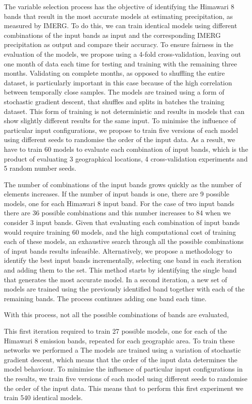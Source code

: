 \documentclass[3p,times]{elsarticle}
\begin{document}
The variable selection process has the objective of identifying the Himawari 8 bands that result in the most accurate models at estimating precipitation, as measured by IMERG. To do this, we can train identical models using different combinations of the input bands as input and the corresponding IMERG precipitation as output and compare their accuracy. To ensure fairness in the evaluation of the models, we propose using a 4-fold cross-validation, leaving out one month of data each time for testing and training with the remaining three months. Validating on complete months, as opposed to shuffling the entire dataset, is particularly important in this case because of the high correlation between temporally close samples. The models are trained using a form of stochastic gradient descent, that shuffles and splits in batches the training dataset. This form of training is not deterministic and results in models that can show slightly different results for the same input. To minimise the influence of particular input configurations, we propose to train five versions of each model using different seeds to randomise the order of the input data. As a result, we have to train 60 models to evaluate each combination of input bands,  which is the product of evaluating 3 geographical locations, 4 cross-validation experiments and 5 random number seeds.

The number of combinations of the input bands grows quickly as the number of elements increases. If the number of input bands is one, there are 9 possible models, one for each Himawari 8 input band. For the case of two input bands there are 36 possible combinations and this number increases to 84 when we consider 3 input bands. Given that evaluating each combination of input bands would require training 60 models, and the high computational cost of training each of these models, an exhaustive search through all the possible combinations of input bands results infeasible. Alternatively, we propose a methodology to identify the best input bands incrementally, selecting one band in each iteration and adding them to the set. This method starts by identifying the single band that generates the most accurate model. In a second iteration, a new set of models are trained using the previously identified band together with each of the remaining bands. The process continues adding one band each time. 

With this process, not all the possible combinations of bands are evaluated, 

This first iteration required to train 27 possible models, one for each of the Himawari 8 emission bands, repeated for each geographic area. To train these networks we performed a  The models are trained using a variation of stochastic gradient descent, which means that the order of the input data determines the model behaviour. To minimise the influence of particular input configurations in the results, we train five versions of each model using different seeds to randomise the order of the input data. This means that to perform this first experiment we train 540 identical models. 
\end{document}
